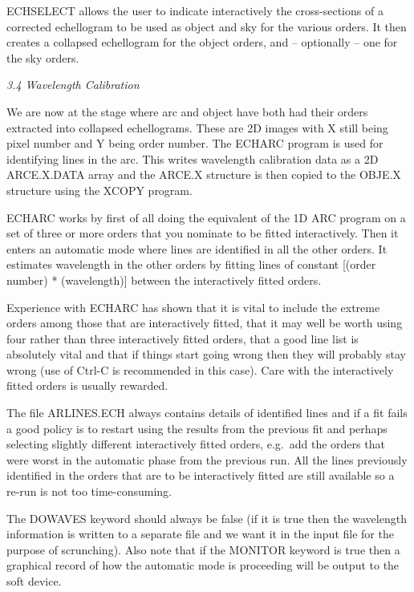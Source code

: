 ECHSELECT allows the user to indicate interactively the cross-sections of a
corrected echellogram to be used as object and sky for the various orders. It
then creates a collapsed echellogram for the object orders, and -- optionally
-- one for the sky orders.


\goodbreak
\vspace{12pt}
{\it 3.4 Wavelength Calibration}

We are now at the stage where arc and object have both had their orders
extracted into collapsed echellograms. These are 2D images with X still being
pixel number and Y being order number. The ECHARC program is used for
identifying lines in the arc. This writes wavelength calibration data as a 2D
ARCE.X.DATA array and the ARCE.X structure is then copied to the OBJE.X
structure using the XCOPY program.

ECHARC works by first of all doing the equivalent of the 1D ARC program
on a set of three or more orders that you nominate to be fitted interactively.
Then it enters an automatic mode where lines are identified in all the other
orders. It estimates wavelength in the other orders by fitting lines of
constant [(order number) * (wavelength)] between the interactively fitted
orders.

Experience with ECHARC has shown that it is vital to include the extreme
orders among those that are interactively fitted, that it may well be worth
using four rather than three interactively fitted orders, that a good line
list is absolutely vital and that if things start going wrong then they
will probably stay wrong (use of Ctrl-C is recommended in this case). Care with
the interactively fitted orders is usually rewarded.

The file ARLINES.ECH always contains details of identified lines and if
a fit fails a good policy is to restart using the results from the previous
fit and perhaps selecting slightly different interactively fitted orders,
e.g.\ add the orders that were worst in the automatic phase from the previous
run. All the lines previously identified in the orders that are to be
interactively fitted are still available so a re-run is not too time-consuming.

The DOWAVES keyword should always be false (if it is true then the wavelength
information is written to a separate file and we want it in the input file
for the purpose of scrunching). Also note that if the MONITOR keyword is
true then a graphical record of how the automatic mode is proceeding will
be output to the soft device.

